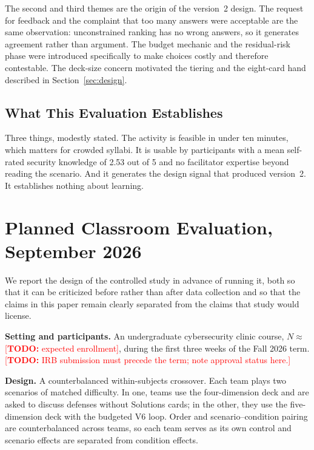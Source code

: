 \documentclass[10pt,twocolumn,letterpaper]{article}
\newcommand{\todo}[1]{\textcolor{red}{[\textbf{TODO:} #1]}}
\begin{document}
The second and third themes are the origin of the version~2 design. The request
for feedback and the complaint that too many answers were acceptable are the
same observation: unconstrained ranking has no wrong answers, so it generates
agreement rather than argument. The budget mechanic and the residual-risk phase
were introduced specifically to make choices costly and therefore contestable.
The deck-size concern motivated the tiering and the eight-card hand described in
Section~\ref{sec:design}.

\subsection{What This Evaluation Establishes}

Three things, modestly stated. The activity is feasible in under ten minutes,
which matters for crowded syllabi. It is usable by participants with a mean
self-rated security knowledge of 2.53 out of 5 and no facilitator expertise
beyond reading the scenario. And it generates the design signal that produced
version~2. It establishes nothing about learning.

\section{Planned Classroom Evaluation, September 2026}
\label{sec:planned}

We report the design of the controlled study in advance of running it, both so
that it can be criticized before rather than after data collection and so that
the claims in this paper remain clearly separated from the claims that study
would license.

\textbf{Setting and participants.} An undergraduate cybersecurity clinic course,
$N \approx$ \todo{expected enrollment}, during the first three weeks of the
Fall 2026 term.
\todo{IRB submission must precede the term; note approval status here.}

\textbf{Design.} A counterbalanced within-subjects crossover. Each team plays
two scenarios of matched difficulty. In one, teams use the four-dimension deck
and are asked to discuss defenses without Solutions cards; in the other, they
use the five-dimension deck with the budgeted V6 loop. Order and
scenario--condition pairing are counterbalanced across teams, so each team
serves as its own control and scenario effects are separated from condition
effects.
\end{document}
